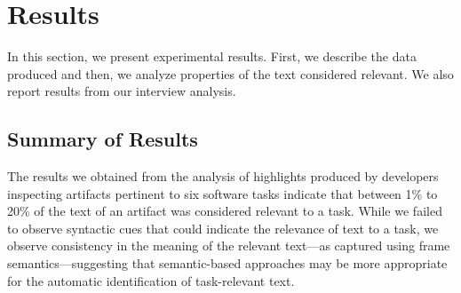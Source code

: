 
\section{Results}
\label{cp3:results}


In this section, we present experimental results. 
First, we describe the data produced
and 
then, we analyze properties of the text considered relevant. 
We also report results from our interview analysis.










\subsection{Summary of Results}


The results we obtained 
from the analysis of highlights produced by 
developers inspecting artifacts 
pertinent to six software tasks indicate that
between 1\% to 20\% of the text of an artifact was considered
relevant to a task.
While we failed to observe syntactic cues 
that could indicate the relevance of text to a task, 
we observe consistency in the meaning of the relevant text---as captured using frame semantics---suggesting that semantic-based approaches 
may be more appropriate for the 
automatic identification of task-relevant text.









